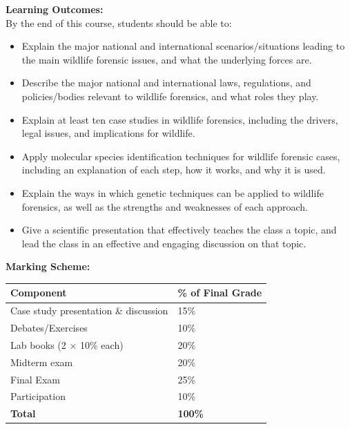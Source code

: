 \documentclass[hidelinks]{article}
\begin{document}
	
	\textbf{Learning Outcomes:}\\
	By the end of this course, students should be able to:
		\begin{itemize}[topsep=-8pt]
			\item Explain the major national and international scenarios/situations leading to the main wildlife forensic issues, and what the underlying forces are.
			\item Describe the major national and international laws, regulations, and policies/bodies relevant to wildlife forensics, and what roles they play.
			\item Explain at least ten case studies in wildlife forensics, including the drivers, legal issues, and implications for wildlife.
			\item Apply molecular species identification techniques for wildlife forensic cases, including an explanation of each step, how it works, and why it is used.
			\item Explain the ways in which genetic techniques can be applied to wildlife forensics, as well as the strengths and weaknesses of each approach.
			\item Give a scientific presentation that effectively teaches the class a topic, and lead the class in an effective and engaging discussion on that topic.\\
		\end{itemize}

	
	\vspace{0.3cm}
	\textbf{Marking Scheme:}
		\begin{table}[H]
		\centering
			\begin{tabular}{l l}
				\toprule
				\textbf{Component} & \textbf{\% of Final Grade}\\
				\midrule
				Case study presentation \& discussion & 15\%\\
				\addlinespace
				Debates/Exercises & 10\%\\
				\addlinespace
				Lab books (2 $\times$ 10\% each) & 20\%\\
				\addlinespace
				Midterm exam & 20\%\\
				\addlinespace
				Final Exam & 25\%\\
				\addlinespace
				Participation & 10\%\\
				\midrule
				\textbf{Total} & \textbf{100\%}\\
				\bottomrule
			\end{tabular}
		\end{table}	
\end{document}

